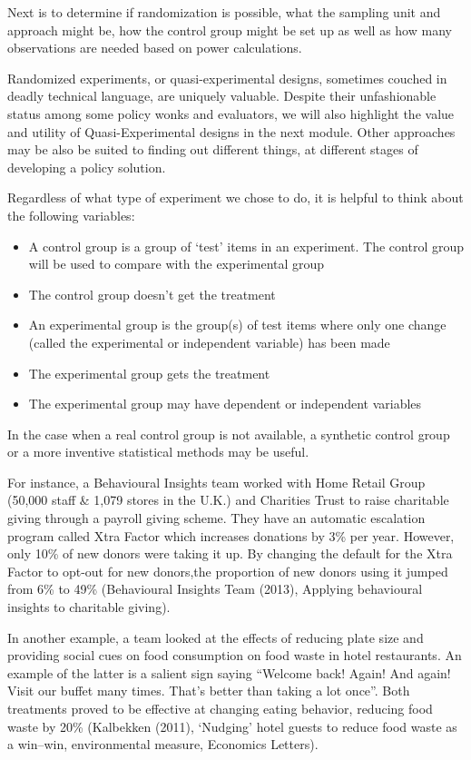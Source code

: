 \documentclass[openany]{book}
\providecommand{\tightlist}{%
  \setlength{\itemsep}{0pt}\setlength{\parskip}{0pt}}
\begin{document}
Next is to determine if randomization is possible, what the sampling unit and approach might be, how the control group might be set up as well as how many observations are needed based on power calculations.

Randomized experiments, or quasi-experimental designs, sometimes couched in deadly technical language, are uniquely valuable. Despite their unfashionable status among some policy wonks and evaluators, we will also highlight the value and utility of Quasi-Experimental designs in the next module. Other approaches may be also be suited to finding out different things, at different stages of developing a policy solution.

Regardless of what type of experiment we chose to do, it is helpful to think about the following variables:

\begin{itemize}
\tightlist
\item
  A control group is a group of `test' items in an experiment. The control group will be used to compare with the experimental group
\item
  The control group doesn't get the treatment
\item
  An experimental group is the group(s) of test items where only one change (called the experimental or independent variable) has been made
\item
  The experimental group gets the treatment
\item
  The experimental group may have dependent or independent variables
\end{itemize}

In the case when a real control group is not available, a synthetic control group or a more inventive statistical methods may be useful.

For instance, a Behavioural Insights team worked with Home Retail Group (50,000 staff \& 1,079 stores in the U.K.) and Charities Trust to raise charitable giving through a payroll giving scheme. They have an
automatic escalation program called Xtra Factor which increases donations by 3\% per year. However, only 10\% of new donors were taking it up.
By changing the default for the Xtra Factor to opt-out for new donors,the proportion of new
donors using it jumped from 6\% to 49\% (Behavioural Insights Team (2013), Applying behavioural insights to charitable giving).

In another example, a team looked at the effects of reducing plate size and providing social cues on food consumption on food waste in hotel restaurants. An example of the latter is a salient sign saying ``Welcome back! Again! And again! Visit our buffet many times. That's better than taking a lot once''. Both treatments proved to be effective at changing eating behavior, reducing food waste by 20\% (Kalbekken (2011), `Nudging' hotel guests to reduce food waste as a win--win, environmental measure, Economics Letters).
\end{document}
